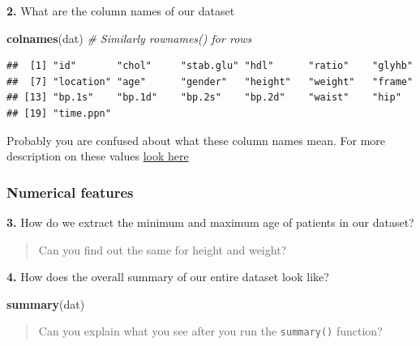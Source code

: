 \documentclass[
]{book}
\newenvironment{Shaded}{\begin{snugshade}}{\end{snugshade}}
\newcommand{\CommentTok}[1]{\textcolor[rgb]{0.56,0.35,0.01}{\textit{#1}}}
\newcommand{\FunctionTok}[1]{\textcolor[rgb]{0.13,0.29,0.53}{\textbf{#1}}}
\newcommand{\NormalTok}[1]{#1}
\newcommand{\SpecialCharTok}[1]{\textcolor[rgb]{0.81,0.36,0.00}{\textbf{#1}}}
\begin{document}
\textbf{2.} What are the column names of our dataset

\begin{Shaded}
\begin{Highlighting}[]
\FunctionTok{colnames}\NormalTok{(dat) }\CommentTok{\# Similarly rownames() for rows}
\end{Highlighting}
\end{Shaded}

\begin{verbatim}
##  [1] "id"       "chol"     "stab.glu" "hdl"      "ratio"    "glyhb"   
##  [7] "location" "age"      "gender"   "height"   "weight"   "frame"   
## [13] "bp.1s"    "bp.1d"    "bp.2s"    "bp.2d"    "waist"    "hip"     
## [19] "time.ppn"
\end{verbatim}

Probably you are confused about what these column names mean.
For more description on these values \href{https://biostat.app.vumc.org/wiki/pub/Main/DataSets/Cdiabetes.html}{look here}

\hypertarget{numerical-features}{%
\subsubsection{Numerical features}\label{numerical-features}}

\textbf{3.} How do we extract the minimum and maximum age of patients in our dataset?

\begin{Shaded}
\end{Shaded}

\begin{quote}
Can you find out the same for height and weight?
\end{quote}

\textbf{4.} How does the overall summary of our entire dataset look like?

\begin{Shaded}
\begin{Highlighting}[]
\FunctionTok{summary}\NormalTok{(dat)}
\end{Highlighting}
\end{Shaded}

\begin{quote}
Can you explain what you see after you run the \texttt{summary()} function?
\end{quote}
\end{document}
